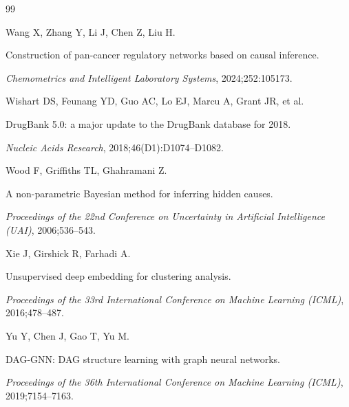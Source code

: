 \documentclass[12pt,a4paper]{article}
\begin{document}
\begin{thebibliography}{99}

Wang X, Zhang Y, Li J, Chen Z, Liu H.




Construction of pan-cancer regulatory networks based on causal inference.




\textit{Chemometrics and Intelligent Laboratory Systems}, 2024;252:105173.




Wishart DS, Feunang YD, Guo AC, Lo EJ, Marcu A, Grant JR, et al.




DrugBank 5.0: a major update to the DrugBank database for 2018.




\textit{Nucleic Acids Research}, 2018;46(D1):D1074--D1082.




Wood F, Griffiths TL, Ghahramani Z.




A non-parametric Bayesian method for inferring hidden causes.




\textit{Proceedings of the 22nd Conference on Uncertainty in Artificial Intelligence (UAI)}, 2006;536--543.













Xie J, Girshick R, Farhadi A.




Unsupervised deep embedding for clustering analysis.




\textit{Proceedings of the 33rd International Conference on Machine Learning (ICML)}, 2016;478--487.




Yu Y, Chen J, Gao T, Yu M.




DAG-GNN: DAG structure learning with graph neural networks.




\textit{Proceedings of the 36th International Conference on Machine Learning (ICML)}, 2019;7154--7163.




\end{thebibliography}
\end{document}
